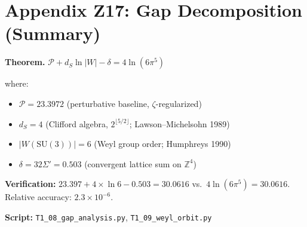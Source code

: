 \documentclass[11pt]{article}
\begin{document}
\section*{Appendix Z17: Gap Decomposition (Summary)}

\textbf{Theorem.}
$\mathcal{P} + d_S \ln|W| - \delta = 4\ln(6\pi^5)$

where:
\begin{itemize}
\item $\mathcal{P} = 23.3972$ (perturbative baseline, $\zeta$-regularized)
\item $d_S = 4$ (Clifford algebra, $2^{\lfloor 5/2 \rfloor}$; Lawson--Michelsohn 1989)
\item $|W(\mathrm{SU}(3))| = 6$ (Weyl group order; Humphreys 1990)
\item $\delta = 32\Sigma' = 0.503$ (convergent lattice sum on $\mathbb{Z}^4$)
\end{itemize}

\textbf{Verification:}
$23.397 + 4\times\ln 6 - 0.503 = 30.0616$ vs.\ $4\ln(6\pi^5) = 30.0616$.
Relative accuracy: $2.3 \times 10^{-6}$.

\textbf{Script:} \texttt{T1\_08\_gap\_analysis.py}, \texttt{T1\_09\_weyl\_orbit.py}
\end{document}
